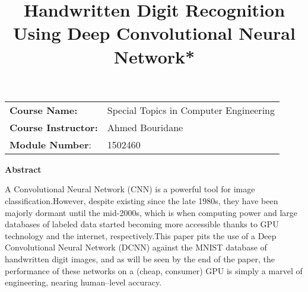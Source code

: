\documentclass[conference]{IEEEtran}
\begin{document}
\title{Handwritten Digit Recognition Using Deep Convolutional Neural Network*}




\author{

\and


\and

}

\onecolumn
\maketitle
\begin{table}[!htp]
    \centering
    \begin{tabular}{ll}
        \textbf{Course Name:} & Special Topics in Computer Engineering\\
        \textbf{Course Instructor:} & Ahmed Bouridane\\
        \textbf{Module Number}: & 1502460
    \end{tabular}
\end{table}
\thispagestyle{plain}
\pagestyle{plain}
\begin{center}
    \textbf{Abstract}
\end{center}
    A Convolutional Neural Network (CNN) is a powerful tool for image classification.\@ However, despite existing since the late 1980s, they have been majorly dormant until the mid-2000s, which is when computing power and large databases of labeled data started becoming more accessible thanks to GPU technology and the internet, respectively.\@ This paper pits the use of a Deep Convolutional Neural Network (DCNN) against the MNIST database of handwritten digit images, and as will be seen by the end of the paper, the performance of these networks on a (cheap, consumer) GPU is simply a marvel of engineering, nearing human--level accuracy.

\twocolumn
\end{document}
